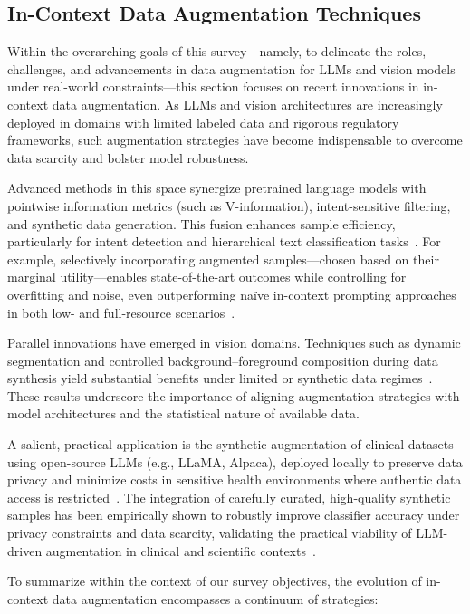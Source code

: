 \documentclass[sigconf]{acmart}
\begin{document}
\subsection{In-Context Data Augmentation Techniques}

Within the overarching goals of this survey—namely, to delineate the roles, challenges, and advancements in data augmentation for LLMs and vision models under real-world constraints—this section focuses on recent innovations in in-context data augmentation. As LLMs and vision architectures are increasingly deployed in domains with limited labeled data and rigorous regulatory frameworks, such augmentation strategies have become indispensable to overcome data scarcity and bolster model robustness.

Advanced methods in this space synergize pretrained language models with pointwise information metrics (such as V-information), intent-sensitive filtering, and synthetic data generation. This fusion enhances sample efficiency, particularly for intent detection and hierarchical text classification tasks~\cite{ref61}. For example, selectively incorporating augmented samples—chosen based on their marginal utility—enables state-of-the-art outcomes while controlling for overfitting and noise, even outperforming naïve in-context prompting approaches in both low- and full-resource scenarios~\cite{ref61}.

Parallel innovations have emerged in vision domains. Techniques such as dynamic segmentation and controlled background–foreground composition during data synthesis yield substantial benefits under limited or synthetic data regimes~\cite{ref62}. These results underscore the importance of aligning augmentation strategies with model architectures and the statistical nature of available data.

A salient, practical application is the synthetic augmentation of clinical datasets using open-source LLMs (e.g., LLaMA, Alpaca), deployed locally to preserve data privacy and minimize costs in sensitive health environments where authentic data access is restricted~\cite{ref57}. The integration of carefully curated, high-quality synthetic samples has been empirically shown to robustly improve classifier accuracy under privacy constraints and data scarcity, validating the practical viability of LLM-driven augmentation in clinical and scientific contexts~\cite{ref57}.

To summarize within the context of our survey objectives, the evolution of in-context data augmentation encompasses a continuum of strategies:
\end{document}
